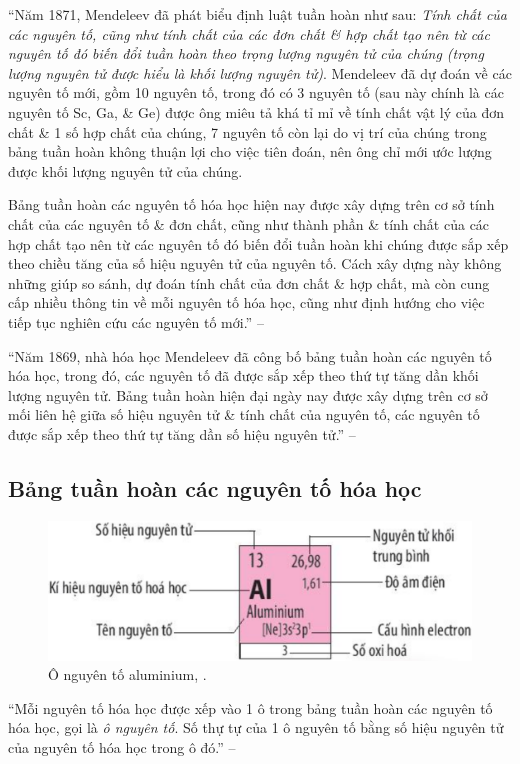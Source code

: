 \documentclass[oneside]{book}
\numberwithin{equation}{section}
\begin{document}
``Năm 1871, Mendeleev đã phát biểu định luật tuần hoàn như sau: \textit{Tính chất của các nguyên tố, cũng như tính chất của các đơn chất \& hợp chất tạo nên từ các nguyên tố đó biến đổi tuần hoàn theo trọng lượng nguyên tử của chúng (trọng lượng nguyên tử được hiểu là khối lượng nguyên tử)}. Mendeleev đã dự đoán về các nguyên tố mới, gồm 10 nguyên tố, trong đó có 3 nguyên tố (sau này chính là các nguyên tố Sc, Ga, \& Ge) được ông miêu tả khá tỉ mỉ về tính chất vật lý của đơn chất \& 1 số hợp chất của chúng, 7 nguyên tố còn lại do vị trí của chúng trong bảng tuần hoàn không thuận lợi cho việc tiên đoán, nên ông chỉ mới ước lượng được khối lượng nguyên tử của chúng.

Bảng tuần hoàn các nguyên tố hóa học hiện nay được xây dựng trên cơ sở tính chất của các nguyên tố \& đơn chất, cũng như thành phần \& tính chất của các hợp chất tạo nên từ các nguyên tố đó biến đổi tuần hoàn khi chúng được sắp xếp theo chiều tăng của số hiệu nguyên tử của nguyên tố. Cách xây dựng này không những giúp so sánh, dự đoán tính chất của đơn chất \& hợp chất, mà còn cung cấp nhiều thông tin về mỗi nguyên tố hóa học, cũng như định hướng cho việc tiếp tục nghiên cứu các nguyên tố mới.'' -- \cite[p. 36]{SGK_Hoa_Hoc_10_Chan_Troi_Sang_Tao}

``Năm 1869, nhà hóa học Mendeleev đã công bố bảng tuần hoàn các nguyên tố hóa học, trong đó, các nguyên tố đã được sắp xếp theo thứ tự tăng dần khối lượng nguyên tử. Bảng tuần hoàn hiện đại ngày nay được xây dựng trên cơ sở mối liên hệ giữa số hiệu nguyên tử \& tính chất của nguyên tố, các nguyên tố được sắp xếp theo thứ tự tăng dần số hiệu nguyên tử.'' -- \cite[p. 38]{SGK_Hoa_Hoc_10_Chan_Troi_Sang_Tao}

\subsection{Bảng tuần hoàn các nguyên tố hóa học}

\begin{figure}[h]
	\centering
	\includegraphics[scale=0.15]{o_nguyen_to_aluminium}
	\caption{Ô nguyên tố aluminium, \cite[p. 38]{SGK_Hoa_Hoc_10_Chan_Troi_Sang_Tao}.}
\end{figure}
``Mỗi nguyên tố hóa học được xếp vào 1 ô trong bảng tuần hoàn các nguyên tố hóa học, gọi là \textit{ô nguyên tố}. Số thự tự của 1 ô nguyên tố bằng số hiệu nguyên tử của nguyên tố hóa học trong ô đó.'' -- \cite[p. 38]{SGK_Hoa_Hoc_10_Chan_Troi_Sang_Tao}
\end{document}
